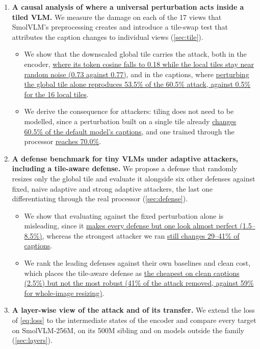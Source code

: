 \documentclass[10pt,twocolumn,letterpaper]{article}
\begin{document}
\begin{enumerate}[leftmargin=*,itemsep=2pt,topsep=2pt]
  \item \textbf{A causal analysis of where a universal perturbation acts inside a tiled VLM.} We measure the damage on each of the 17 views that SmolVLM's preprocessing creates and introduce a tile-swap test that attributes the caption changes to individual views (\cref{sec:tile}).
  \begin{itemize}[leftmargin=*,itemsep=1pt,topsep=1pt]
    \item We show that the downscaled global tile carries the attack, both in the encoder, \hyperref[fig:tiles]{where its token cosine falls to 0.18 while the local tiles stay near random noise (0.73 against 0.77)}, and in the captions, where \hyperref[tab:swap]{perturbing the global tile alone reproduces 53.5\% of the 60.5\% attack, against 0.5\% for the 16 local tiles}.
    \item We derive the consequence for attackers: tiling does not need to be modelled, since a perturbation built on a single tile already \hyperref[tab:attack]{changes 60.5\% of the default model's captions}, and one trained through the processor \hyperref[tab:swap]{reaches 70.0\%}.
  \end{itemize}
  \item \textbf{A defense benchmark for tiny VLMs under adaptive attackers, including a tile-aware defense.} We propose a defense that randomly resizes only the global tile and evaluate it alongside six other defenses against fixed, naive adaptive and strong adaptive attackers, the last one differentiating through the real processor (\cref{sec:defense}).
  \begin{itemize}[leftmargin=*,itemsep=1pt,topsep=1pt]
    \item We show that evaluating against the fixed perturbation alone is misleading, since it \hyperref[fig:defenses]{makes every defense but one look almost perfect (1.5--8.5\%)}, whereas the strongest attacker we ran \hyperref[tab:defense]{still changes 29--41\% of captions}.
    \item We rank the leading defenses against their own baselines and clean cost, which places the tile-aware defense as \hyperref[tab:defense]{the cheapest on clean captions (2.5\%) but not the most robust (41\% of the attack removed, against 59\% for whole-image resizing)}.
  \end{itemize}
  \item \textbf{A layer-wise view of the attack and of its transfer.} We extend the loss of \cref{eq:loss} to the intermediate states of the encoder and compare every target on SmolVLM-256M, on its 500M sibling and on models outside the family (\cref{sec:layers}).

\end{enumerate}
\end{document}

